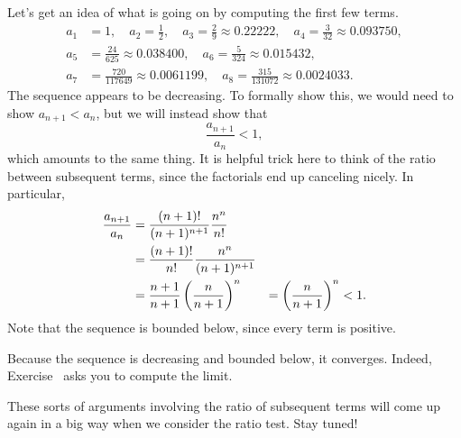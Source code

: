 \documentclass{ximera}
\newcommand{\ds}{\displaystyle}
\begin{document}
\begin{solution}
  Let's get an idea of what is going on by computing the first few terms.
\begin{align*}
a_1&= 1,\quad a_2= \frac{1}{2},\quad a_3= \frac{2}{9} \approx 0.22222,\quad a_4= \frac{3}{32} \approx 0.093750, \\
a_5&= \frac{24}{625} \approx 0.038400, \quad a_6= \frac{5}{324} \approx 0.015432, \\
a_7&= \frac{720}{117649} \approx 0.0061199,\quad a_8= \frac{315}{131072} \approx 0.0024033.
\end{align*}
  The sequence appears to be decreasing.  To formally show this, we would need to show $\ds a_{n+1}< a_n$, but we will instead show that
$$
\frac{a_{n+1}}{a_n} < 1,
$$
which amounts to the same thing.  It is helpful trick here to think of
the ratio between subsequent terms, since the factorials end up
canceling nicely.  In particular,
\begin{align*}
  {a_{n+1}\over a_n} &= {(n+1)!\over (n+1)^{n+1}}{n^n\over n!} \\
  &= {(n+1)!\over n!}{n^n\over (n+1)^{n+1}} \\
  &= {n+1\over n+1}\left({n\over n+1}\right)^n
  &= \left({n\over n+1}\right)^n < 1.
\end{align*}
  Note that the sequence is bounded below, since every term is positive.

  Because the sequence is decreasing and bounded below, it converges.
  Indeed, Exercise~ asks you to
  compute the limit.
\end{solution}

These sorts of arguments involving the ratio of subsequent terms will
come up again in a big way when we consider the ratio test.  Stay
tuned!
\end{document}
